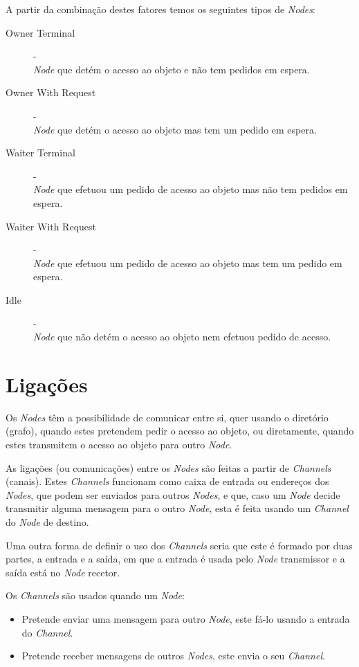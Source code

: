 A partir da combinação destes fatores temos os seguintes tipos de \emph{Nodes}:

\begin{description}
    \item [Owner Terminal] - \\ \emph{Node} que detém o acesso ao objeto e não tem pedidos em espera.
    \item [Owner With Request] - \\ \emph{Node} que detém o acesso ao objeto mas tem um pedido em espera.
    \item [Waiter Terminal] - \\ \emph{Node} que efetuou um pedido de acesso ao objeto mas não tem pedidos em espera.
    \item [Waiter With Request] - \\ \emph{Node} que efetuou um pedido de acesso ao objeto mas tem um pedido em espera.
    \item [Idle] - \\ \emph{Node} que não detém o acesso ao objeto nem efetuou pedido de acesso.
\end{description}



\section{Ligações}

Os \emph{Nodes} têm a possibilidade de comunicar entre si, quer usando o diretório (grafo), quando estes pretendem pedir o acesso ao objeto, ou diretamente, quando estes transmitem o acesso ao objeto para outro \emph{Node}.

As ligações (ou comunicações) entre os \emph{Nodes} são feitas a partir de \emph{Channels} (canais). Estes \emph{Channels} funcionam como caixa de entrada ou endereços dos \emph{Nodes}, que podem ser enviados para outros \emph{Nodes}, e que, caso um \emph{Node} decide transmitir alguma mensagem para o outro \emph{Node}, esta é feita usando um \emph{Channel} do \emph{Node} de destino.

Uma outra forma de definir o uso dos \emph{Channels} seria que este é formado por duas partes, a entrada e a saída, em que a entrada é usada pelo \emph{Node} transmissor e a saída está no \emph{Node} recetor.

Os \emph{Channels} são usados quando um \emph{Node}:
\begin{itemize}
    \item Pretende enviar uma mensagem para outro \emph{Node}, este fá-lo usando a entrada do \emph{Channel}.
    \item Pretende receber mensagens de outros \emph{Nodes}, este envia o seu \emph{Channel}.
\end{itemize}


